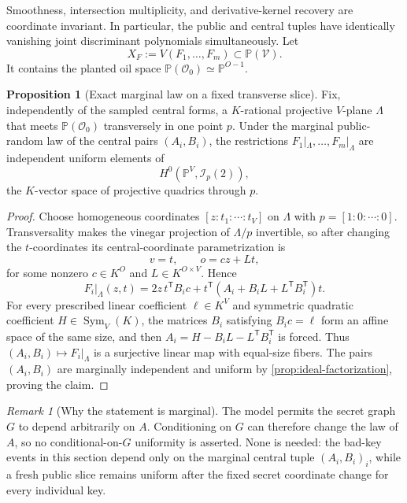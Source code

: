 \documentclass[11pt,a4paper]{article}
\theoremstyle{definition}
\newtheorem{proposition}[theorem]{Proposition}
\theoremstyle{remark}
\newtheorem{remark}[theorem]{Remark}
\newcommand{\PP}{\mathbb P}
\newcommand{\cO}{\mathcal O}
\newcommand{\cV}{\mathcal V}
\newcommand{\Sym}{\operatorname{Sym}}
\begin{document}
Smoothness, intersection multiplicity, and derivative-kernel recovery are coordinate invariant.  In particular, the public and central tuples have identically vanishing joint discriminant polynomials simultaneously.  Let
\[
X_F:=V(F_1,\ldots,F_m)\subset\PP(\cV).
\]
It contains the planted oil space $\PP(\cO_0)\simeq\PP^{O-1}$.

\begin{proposition}[Exact marginal law on a fixed transverse slice]\label{prop:planted-slice-law}
Fix, independently of the sampled central forms, a $K$-rational projective $V$-plane $\Lambda$ that meets $\PP(\cO_0)$ transversely in one point $p$.  Under the marginal public-random law of the central pairs $(A_i,B_i)$, the restrictions $F_1|_\Lambda,\ldots,F_m|_\Lambda$ are independent uniform elements of
\[
H^0\!\left(\PP^V,\mathcal I_p(2)\right),
\]
the $K$-vector space of projective quadrics through $p$.
\end{proposition}

\begin{proof}
Choose homogeneous coordinates $[z:t_1:\cdots:t_V]$ on $\Lambda$ with $p=[1:0:\cdots:0]$.  Transversality makes the vinegar projection of $\Lambda/p$ invertible, so after changing the $t$-coordinates its central-coordinate parametrization is
\[
v=t,\qquad o=cz+Lt,
\]
for some nonzero $c\in K^O$ and $L\in K^{O\times V}$.  Hence
\[
F_i|_\Lambda(z,t)
 =2z\,t^{\mathsf T}B_ic
  +t^{\mathsf T}\!\left(A_i+B_iL+L^{\mathsf T}B_i^{\mathsf T}\right)t.
\]
For every prescribed linear coefficient $\ell\in K^V$ and symmetric quadratic coefficient $H\in\Sym_V(K)$, the matrices $B_i$ satisfying $B_ic=\ell$ form an affine space of the same size, and then $A_i=H-B_iL-L^{\mathsf T}B_i^{\mathsf T}$ is forced.  Thus $(A_i,B_i)\mapsto F_i|_\Lambda$ is a surjective linear map with equal-size fibers.  The pairs $(A_i,B_i)$ are marginally independent and uniform by \cref{prop:ideal-factorization}, proving the claim.
\end{proof}

\begin{remark}[Why the statement is marginal]\label{rem:slice-law-marginal}
The model permits the secret graph $G$ to depend arbitrarily on $A$.  Conditioning on $G$ can therefore change the law of $A$, so no conditional-on-$G$ uniformity is asserted.  None is needed: the bad-key events in this section depend only on the marginal central tuple $(A_i,B_i)_i$, while a fresh public slice remains uniform after the fixed secret coordinate change for every individual key.
\end{remark}
\end{document}
